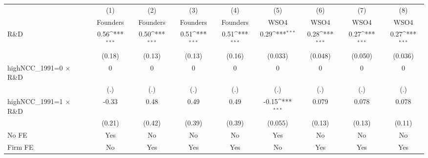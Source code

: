 {
\def\sym#1{\ifmmode^{#1}\else\(^{#1}\)\fi}
\begin{tabular}{l*{8}{c}}
\toprule
                    &\multicolumn{1}{c}{(1)}&\multicolumn{1}{c}{(2)}&\multicolumn{1}{c}{(3)}&\multicolumn{1}{c}{(4)}&\multicolumn{1}{c}{(5)}&\multicolumn{1}{c}{(6)}&\multicolumn{1}{c}{(7)}&\multicolumn{1}{c}{(8)}\\
                    &\multicolumn{1}{c}{Founders}&\multicolumn{1}{c}{Founders}&\multicolumn{1}{c}{Founders}&\multicolumn{1}{c}{Founders}&\multicolumn{1}{c}{WSO4}&\multicolumn{1}{c}{WSO4}&\multicolumn{1}{c}{WSO4}&\multicolumn{1}{c}{WSO4}\\
\midrule
R\&D                &        0.56\sym{***}&        0.50\sym{***}&        0.51\sym{***}&        0.51\sym{***}&        0.29\sym{***}&        0.28\sym{***}&        0.27\sym{***}&        0.27\sym{***}\\
                    &      (0.18)         &      (0.13)         &      (0.13)         &      (0.16)         &     (0.033)         &     (0.048)         &     (0.050)         &     (0.036)         \\
\addlinespace
highNCC\_1991=0 $\times$ R\&D&           0         &           0         &           0         &           0         &           0         &           0         &           0         &           0         \\
                    &         (.)         &         (.)         &         (.)         &         (.)         &         (.)         &         (.)         &         (.)         &         (.)         \\
\addlinespace
highNCC\_1991=1 $\times$ R\&D&       -0.33         &        0.48         &        0.49         &        0.49         &       -0.15\sym{***}&       0.079         &       0.078         &       0.078         \\
                    &      (0.21)         &      (0.42)         &      (0.39)         &      (0.39)         &     (0.055)         &      (0.13)         &      (0.13)         &      (0.11)         \\
\addlinespace
No FE               &         Yes         &          No         &          No         &          No         &         Yes         &          No         &          No         &          No         \\
\addlinespace
Firm FE             &          No         &         Yes         &         Yes         &         Yes         &          No         &         Yes         &         Yes         &         Yes         \\

\end{tabular}}
